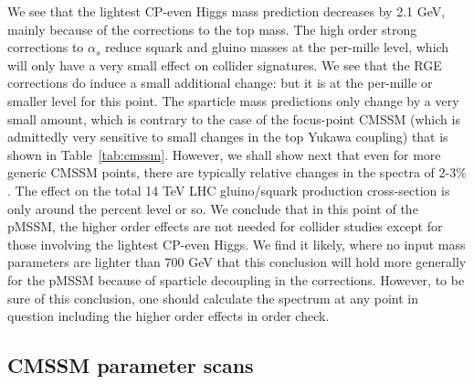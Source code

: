 \documentclass[final,3p,times,pdflatex]{elsarticle}
\begin{document}
We see that the lightest CP-even Higgs mass prediction decreases by 2.1 GeV,
mainly because of the  corrections to the top mass. The high order strong
corrections to $\alpha_s$ reduce
squark and gluino masses at the per-mille level, which will only have a very
small effect on collider signatures. 
We see that the RGE corrections do induce a small additional change: but it is
at the per-mille or smaller level for this point.
The sparticle mass predictions only change by a
very small amount, which is contrary to the case of the focus-point CMSSM
(which is 
admittedly very sensitive to small changes in the top Yukawa coupling) that is
shown in Table~\ref{tab:cmssm}. However, we shall show next that even for more
generic CMSSM points, there are typically relative changes in the spectra of
2-3$\%$. 
The effect on the total 14 TeV LHC gluino/squark production cross-section is
only  around the percent level or so.
We conclude that in this point of the pMSSM, the higher order effects are not
needed for collider studies except for those involving the lightest CP-even
Higgs. We find it likely, where no input mass parameters are lighter
than 700 GeV that this conclusion will hold more generally for the
pMSSM because of sparticle decoupling in the corrections. 
However, to be sure of this conclusion, one should calculate the spectrum
at any point in question including
the higher order effects in order check. 

\subsection{CMSSM parameter scans}
\end{document}
